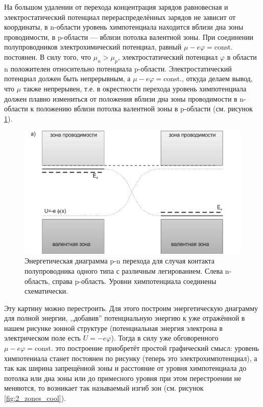 \documentclass[a4paper, 12pt]{article}
\renewcommand{\phi}{\varphi} %
\begin{document}
На большом удалении от перехода концентрация зарядов равновесная и электростатический потенциал перераспределённых зарядов не зависит от координаты, в n-области уровень химпотенциала находится вблизи дна зоны проводимости, в p-области — вблизи потолка валентной зоны. При соединении полупроводников электрохимический потенциал, равный $\mu - e\phi = \text{const.}$ постоянен. В силу того, что $\mu_n > \mu_p$, электростатический потенциал $\phi$ в области n положителен относительно потенциала p-области. Электростатический потенциал должен быть непрерывным, а $\mu - e\phi = \text{const.}$, откуда делаем вывод, что $\mu$ также непрерывен, т.е. в окрестности перехода уровень химпотенциала должен плавно измениться от положения вблизи дна зоны проводимости в n-области к положению вблизи потолка валентной зоны в p-области (см. рисунок \ref{fig:2_zones_not_cool}).

\begin{figure}[H]
	\centering
	\includegraphics[width=0.7\linewidth]{2_zones_not_cool}
	\caption{Энергетическая диаграмма p-n перехода для случая контакта полупроводника одного типа с различным легированием. Слева n-область, справа p-область. Уровни химпотенциала соединены схематически.}
	\label{fig:2_zones_not_cool}
\end{figure}

Эту картину можно перестроить. Для этого построим энергетическую диаграмму для полной энергии, ,,добавив'' потенциальную энергию к уже отражённой в нашем рисунке зонной структуре (потенциальная энергия электрона в электрическом поле есть $U = -e\phi$). Тогда в силу уже обговоренного $\mu - e\phi = \text{const.}$ это построение приобретёт простой графический смысл: уровень химпотениала станет постоянен по рисунку (теперь это электрохимпотенциал), а так как ширина запрещённой зоны и расстояние от уровня химпотенциала до потолка или дна зоны или до примесного уровня при этом перестроении не меняются, то возникает так называемый изгиб зон (см. рисунок \ref{fig:2_zones_cool}).
\end{document}
